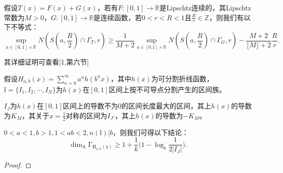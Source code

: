 \begin{lemma}
      假设$T(x)=F(x)+G(x)$，若有$F:[0,1]\rightarrow\mathbb{R}$是Lipschtz连续的，其Lipschtz常数为$M>0$，$G:[0,1]\rightarrow\mathbb{R}$是连续函数，若$0<r<R<1$且$\frac{R}{r}\in\mathbb{Z}$，则我们有以下不等式：
      $$
                  \underset{a\in[0,1]\times\mathbb{R}}{\sup} N(S(a,\frac{R}{2})\cap\Gamma_T,r)
                  \ge\frac{1}{M+2} \underset{a\in[0.1]\times\mathbb{R}}{\sup}N(S(a,\frac{R}{2})\cap\Gamma_G,r)-\frac{M+2}{\lfloor M\rfloor+2}\frac{R}{r}.
      $$
\end{lemma}

其详细证明可查看[1,第六节]


假设$H_{a,b}(x)=\sum_{n=0}^\infty a^nh(b^nx)$，其中$h(x)$为可分割折线函数，
$\mathbb{I}=\{I_1,I_2,\cdots,I_N\}$为$h(x)$在$[0,1]$区间上按不可导点分割产生的区间族。

$I_J$为$h(x)$在$[0,1]$区间上的导数不为$0$的区间长度最大的区间，其上$h(x)$的导数为$K_M$，其关于$x=\frac{1}{2}$对称的区间为$I_{J'}$，其上$h(x)$的导数为$-K_M$。

$0<a<1,b>1,1<ab<2,n(\mathbb{I})|b$，则我们可得以下结论：
$$
      \mathrm{\dim_A\Gamma_{H_{a,b}(x)}}\ge1+\frac{1}{k}\Big(1-\log_b\frac{1}{2|I_J|}\Big).
$$




\begin{proof}

\end{proof}
